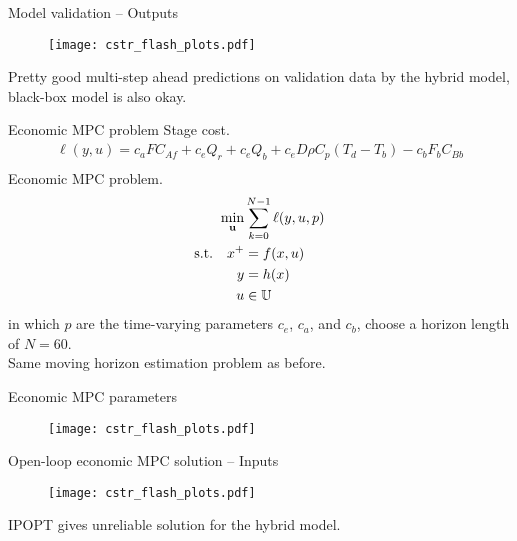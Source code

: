 \documentclass[xcolor=dvipsnames, 8pt]{beamer} %
\newcommand{\useq}{\mathbf{u}}
\newcommand{\bbU}{\mathbb{U}}
\begin{document}
\begin{frame}{Model validation -- Outputs}
	\vspace{-0.1in}
	\begin{figure}
	\centering
	\texttt{[image: cstr\_flash\_plots.pdf]}
	\end{figure}
	\vspace{-0.2in}
Pretty good multi-step ahead predictions on validation data 
by the hybrid model, black-box model is also okay. 
\end{frame}

\begin{frame}{Economic MPC problem}
	Stage cost.
\begin{align*}
\ell(y, u) = c_aFC_{Af} + c_eQ_r + 
		c_eQ_b + c_eD\rho C_p(T_d-T_b) - 
		c_bF_bC_{Bb} \\
\end{align*}
Economic MPC problem.
\begin{align*}
	\min_{\useq} & 
  \sum_{k=0}^{N-1} \ell(y, u, p) \\
	\textnormal{s.t.} \quad   x^+ &= f(x, u)\\
	y &= h(x) \\ 
	u &\in \bbU
  \end{align*}
  in which $p$ are the time-varying parameters $c_e$, $c_a$, and $c_b$, choose a horizon length of $N=60$. \\ 
  Same moving horizon estimation problem as before.
\end{frame}
		
\begin{frame}{Economic MPC parameters}
		\begin{figure}
		\centering
		\texttt{[image: cstr\_flash\_plots.pdf]}
		\end{figure}
\end{frame}
	
\begin{frame}{Open-loop economic MPC solution -- Inputs}
	\vspace{-0.1in}
		\begin{figure}
		\centering
		\texttt{[image: cstr\_flash\_plots.pdf]}
		\end{figure}
		\vspace{-0.2in}
	IPOPT gives unreliable solution for the hybrid model.
\end{frame}
	
\end{document}
